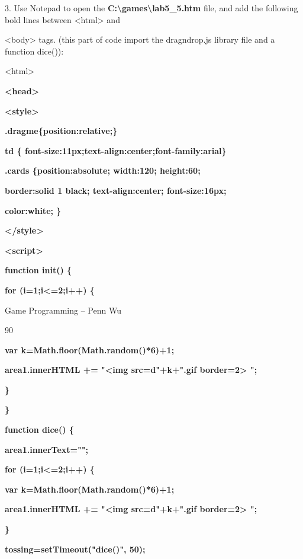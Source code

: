\documentclass[
]{article}
\begin{document}
3. Use Notepad to open the
\textbf{C:\textbackslash games\textbackslash lab5\_5.htm} file, and add
the following bold lines between \textless html\textgreater{} and

\textless body\textgreater{} tags. (this part of code import the
dragndrop.js library file and a function dice()):

\textless html\textgreater{}

\textbf{}

\textbf{\textless head\textgreater{}}

\textbf{}

\textbf{\textless style\textgreater{}}

\textbf{.dragme\{position:relative;\}}

\textbf{td \{ font-size:11px;text-align:center;font-family:arial\}}

\textbf{.cards \{position:absolute; width:120; height:60;}

\textbf{border:solid 1 black; text-align:center; font-size:16px;}

\textbf{color:white; \}}

\textbf{\textless/style\textgreater{}}

\textbf{}

\textbf{\textless script\textgreater{}}

\textbf{}

\textbf{function init() \{}

\textbf{for (i=1;i\textless=2;i++) \{}

Game Programming -- Penn Wu

90

\protect\hypertarget{index_split_006.htmlux5cux23p91}{}{}\textbf{var
k=Math.floor(Math.random()*6)+1;}

\textbf{area1.innerHTML += "\textless img src=d"+k+".gif
border=2\textgreater{} ";}

\textbf{\}}

\textbf{\}}

\textbf{}

\textbf{function dice() \{}

\textbf{area1.innerText="";}

\textbf{for (i=1;i\textless=2;i++) \{}

\textbf{var k=Math.floor(Math.random()*6)+1;}

\textbf{area1.innerHTML += "\textless img src=d"+k+".gif
border=2\textgreater{} ";}

\textbf{\}}

\textbf{tossing=setTimeout("dice()", 50);}
\end{document}
